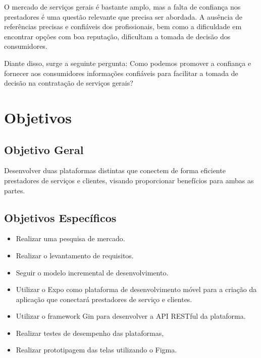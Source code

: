 O mercado de serviços gerais é bastante amplo, mas a falta de confiança nos prestadores é uma questão relevante que precisa ser abordada. A ausência de referências precisas e confiáveis dos profissionais, bem como a dificuldade em encontrar opções com boa reputação, dificultam a tomada de decisão dos consumidores.

Diante disso, surge a seguinte pergunta: Como podemos promover a confiança e fornecer aos consumidores informações confiáveis para facilitar a tomada de decisão na contratação de serviços gerais?
\section{Objetivos}



\subsection{Objetivo Geral}
Desenvolver duas plataformas distintas que conectem de forma eficiente prestadores de serviços e clientes, visando proporcionar benefícios para ambas as partes.
\subsection{Objetivos Específicos}
\begin{itemize}
  \item Realizar uma pesquisa de mercado.
  \item Realizar o levantamento de requisitos.
  \item Seguir o modelo incremental de desenvolvimento.
  \item Utilizar o Expo como plataforma de desenvolvimento móvel para a criação da aplicação que conectará prestadores de serviço e clientes.
  \item Utilizar o framework Gin para desenvolver a API RESTful da plataforma.
  \item Realizar testes de desempenho das plataformas, 
  \item Realizar prototipagem das telas utilizando o Figma.
\end{itemize}
